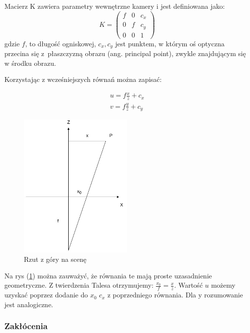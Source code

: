 \documentclass[oneside, eng]{mgr}
\begin{document}
Macierz K zawiera parametry wewnętrzne kamery i jest definiowana jako:
\begin{equation}
	K = \left( \begin{array}{lll}
		f & 0 & c_x \\
		0 & f & c_y \\
		0 & 0 & 1
	\end{array} \right)
\end{equation}
gdzie $f$, to długość ogniskowej, $c_x, c_y$ jest punktem, w którym oś optyczna przecina się z~płaszczyzną obrazu (ang. principal point), zwykle znajdującym się w środku obrazu.

Korzystając z wcześniejszych równań można zapisać:

\begin{align*}
	u = f \frac{x}{z} + c_x \\
	v = f \frac{y}{z} + c_y
\end{align*}

\begin{figure}
\centering
	\includegraphics[width=0.50\textwidth]{img/rzutowanie.jpg}\par\vspace{1cm}
\caption{Rzut z góry na scenę}
	\label{fig:projection_up}
\end{figure}

Na rys (\ref{fig:projection_up}) można zauważyć, że równania te mają proste uzasadnienie geometryczne. Z twierdzenia Talesa otrzymujemy: 
$\frac{x_0}{f} = \frac{x}{z}$. Wartość $u$ możemy uzyskać poprzez dodanie do $x_0$ $c_x$ z poprzedniego równania. Dla y rozumowanie jest analogiczne.


\subsubsection{Zakłócenia}
\end{document}
